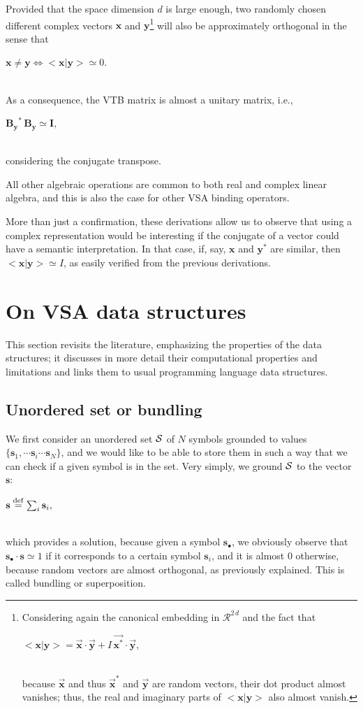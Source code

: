 \documentclass[sn-mathphys]{sn-jnl}
\newcommand{\defq}{\stackrel {\rm def}{=}}
\newcommand{\eqline}[1]{~\vspace{0.1cm}\\\centerline{$#1$}\vspace{0.1cm}\\}
\begin{document}
\begin{appendices}
Provided that the space dimension $d$ is large enough, two randomly chosen different complex vectors $\mathbf{x}$ and $\mathbf{y}$\footnote{
Considering again the canonical embedding in ${\mathcal R}^{2\,d}$ and the fact that
\eqline{<\mathbf{x} \vert \mathbf{y}> = \overrightarrow{\mathbf{x}} \cdot \overrightarrow{\mathbf{y}} + I \, 
  \overrightarrow{\mathbf{x}^*} \cdot \overrightarrow{\mathbf{y}},}
because $\overrightarrow{\mathbf{x}}$ and thus $\overrightarrow{\mathbf{x}}^*$ and $\overrightarrow{\mathbf{y}}$ are random vectors, their dot product almost vanishes; thus, the real and imaginary parts of $<\mathbf{x} \vert \mathbf{y}>$ also almost vanish.} will also be approximately orthogonal in the sense that
\eqline{\mathbf{x} \neq \mathbf{y} \Leftrightarrow <\mathbf{x} \vert \mathbf{y}> \simeq 0.}
As a consequence, the VTB matrix is almost a unitary matrix, i.e., 
\eqline{\mathbf{B_y}^* \, \mathbf{B_y} \simeq \mathbf{I},}
considering the conjugate transpose.

All other algebraic operations are common to both real and complex linear algebra, and this is also the case for other VSA binding operators.

More than just a confirmation, these derivations allow us to observe that using a complex representation would be interesting if the conjugate of a vector could have a semantic interpretation. In that case, if, say, $\mathbf{x}$ and $\mathbf{y}^*$ are similar, then $<\mathbf{x} \vert \mathbf{y}> \simeq I$, as easily verified from the previous derivations. 

\section{On VSA data structures} \label{data-structure}

This section revisits the literature, emphasizing the properties of the data structures; it discusses in more detail their computational properties and limitations and links them to usual programming language data structures.

\subsection{Unordered set or bundling}

We first consider an unordered set ${\cal S}$ of $N$ symbols grounded to values $\{\mathbf{s}_1, \cdots \mathbf{s}_i \cdots \mathbf{s}_N\}$, and we would like to be able to store them in such a way that we can check if a given symbol is in the set. Very simply, we ground ${\cal S}$ to the vector $\mathbf{s}$:
\eqline{\mathbf{s} \defq \sum_i \mathbf{s}_i,}
which provides a solution, because given a symbol $\mathbf{s}_\bullet$, we obviously observe that $\mathbf{s}_\bullet \cdot \mathbf{s} \simeq 1$ if it corresponds to a certain symbol $\mathbf{s}_i$, and it is almost $0$ otherwise, because random vectors are almost orthogonal, as previously explained. This is called bundling \cite{schlegel_comparison_2020} or superposition.


\end{appendices}
\end{document}
